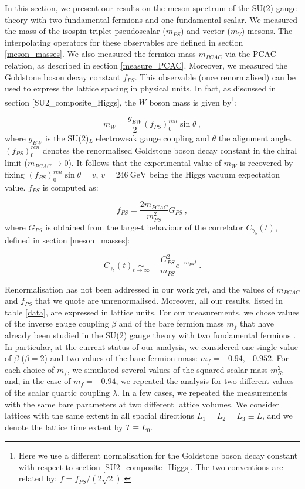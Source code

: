 In this section, we present our results on the meson spectrum of the SU(2) gauge theory with two fundamental fermions and one fundamental scalar. We measured the mass of the isospin-triplet pseudoscalar ($m_{PS}$) and vector ($m_V$) mesons. The interpolating operators for these observables are defined in section \ref{meson_masses}. We also measured the fermion mass $m_{PCAC}$ via the PCAC relation, as described in section \ref{measure_PCAC}. Moreover, we measured the Goldstone boson decay constant $f_{PS}$. This observable (once renormalised) can be used to express the lattice spacing in physical units. In fact, as discussed in section \ref{SU2_composite_Higgs}, the $W$ boson mass is given by\footnote{Here we use a different normalisation for the Goldstone boson decay constant with respect to section \ref{SU2_composite_Higgs}. The two conventions are related by: $f = f_{PS}/(2 \sqrt 2)$.}:

\begin{equation}
m_W = \frac{g_{EW}}{2} (f_{PS})^{ren}_0 \sin \theta \: ,
\end{equation}
%
where $g_{EW}$ is the SU(2)$_L$ electroweak gauge coupling and $\theta$ the alignment angle. $(f_{PS})^{ren}_0$ denotes the renormalised Goldstone boson decay constant in the chiral limit ($m_{PCAC} \to 0$). It follows that the experimental value of $m_W$ is recovered by fixing $(f_{PS})^{ren}_0 \sin \theta = v$, $v = 246 \: \mathrm{GeV}$ being the Higgs vacuum expectation value. $f_{PS}$ is computed as:

\begin{equation}
f_{PS} = \frac{2 m_{PCAC}}{m_{PS}^2} G_{PS} \: ,
\end{equation}
%
where $G_{PS}$ is obtained from the large-t behaviour of the correlator $C_{\gamma_5}(t)$, defined in section \ref{meson_masses}:

\begin{equation}
C_{\gamma_5}(t) \underset{t \to \infty}{\sim} -\frac{G^2_{PS}}{m_{PS}} e^{-m_{PS} t} \: .
\end{equation}


Renormalisation has not been addressed in our work yet, and the values of $m_{PCAC}$ and $f_{PS}$ that we quote are unrenormalised. Moreover, all our results, listed in table \ref{data}, are expressed in lattice units. For our measurements, we chose values of the inverse gauge coupling $\beta$ and of the bare fermion mass $m_f$ that have already been studied in the SU(2) gauge theory with two fundamental fermions \cite{Arthur:2016dir}. In particular, at the current status of our analysis, we considered one single value of $\beta$ ($\beta = 2$) and two values of the bare fermion mass: $m_f = -0.94, -0.952$. For each choice of $m_f$, we simulated several values of the squared scalar mass $m_S^2$, and, in the case of $m_f = -0.94$, we repeated the analysis for two different values of the scalar quartic coupling $\lambda$. In a few cases, we repeated the measurements with the same bare parameters at two different lattice volumes. We consider lattices with the same extent in all spacial directions $L_1 = L_2 = L_3 \equiv L$, and we denote the lattice time extent by $T \equiv L_0$. 

